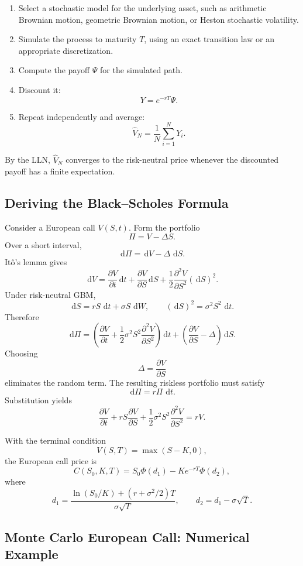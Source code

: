 \documentclass[12pt,openany]{book}
\theoremstyle{definition}
\theoremstyle{remark}
\newcommand{\dd}{\,\mathrm{d}}
\begin{document}
\begin{enumerate}
    \item Select a stochastic model for the underlying asset, such as
    arithmetic Brownian motion, geometric Brownian motion, or Heston
    stochastic volatility.
    \item Simulate the process to maturity \(T\), using an exact transition
    law or an appropriate discretization.
    \item Compute the payoff \(\Psi\) for the simulated path.
    \item Discount it:
    \[
    Y=e^{-rT}\Psi.
    \]
    \item Repeat independently and average:
    \[
    \widehat V_N=\frac1N\sum_{i=1}^{N}Y_i.
    \]
\end{enumerate}
By the LLN, \(\widehat V_N\) converges to the risk-neutral price whenever the
discounted payoff has a finite expectation.

\subsection{Deriving the Black--Scholes Formula}

Consider a European call \(V(S,t)\). Form the portfolio
\[
\Pi=V-\Delta S.
\]
Over a short interval,
\[
\dd\Pi=\dd V-\Delta\,\dd S.
\]
It\^o's lemma gives
\[
\dd V
=\frac{\partial V}{\partial t}\dd t
+\frac{\partial V}{\partial S}\dd S
+\frac12\frac{\partial^2V}{\partial S^2}(\dd S)^2.
\]
Under risk-neutral GBM,
\[
\dd S=rS\,\dd t+\sigma S\,\dd W,
\qquad
(\dd S)^2=\sigma^2S^2\,\dd t.
\]
Therefore
\[
\dd\Pi
=\left(
\frac{\partial V}{\partial t}
+\frac12\sigma^2S^2\frac{\partial^2V}{\partial S^2}
\right)\dd t
+\left(\frac{\partial V}{\partial S}-\Delta\right)\dd S.
\]
Choosing
\[
\Delta=\frac{\partial V}{\partial S}
\]
eliminates the random term. The resulting riskless portfolio must satisfy
\[
\dd\Pi=r\Pi\,\dd t.
\]
Substitution yields
\[
\frac{\partial V}{\partial t}
+rS\frac{\partial V}{\partial S}
+\frac12\sigma^2S^2\frac{\partial^2V}{\partial S^2}
=rV.
\]

With the terminal condition
\[
V(S,T)=\max(S-K,0),
\]
the European call price is
\[
\boxed{
C(S_0,K,T)=S_0\Phi(d_1)-Ke^{-rT}\Phi(d_2),
}
\]
where
\[
d_1
=\frac{\ln(S_0/K)+(r+\sigma^2/2)T}{\sigma\sqrt T},
\qquad
d_2=d_1-\sigma\sqrt T.
\]

\subsection{Monte Carlo European Call: Numerical Example}
\end{document}

